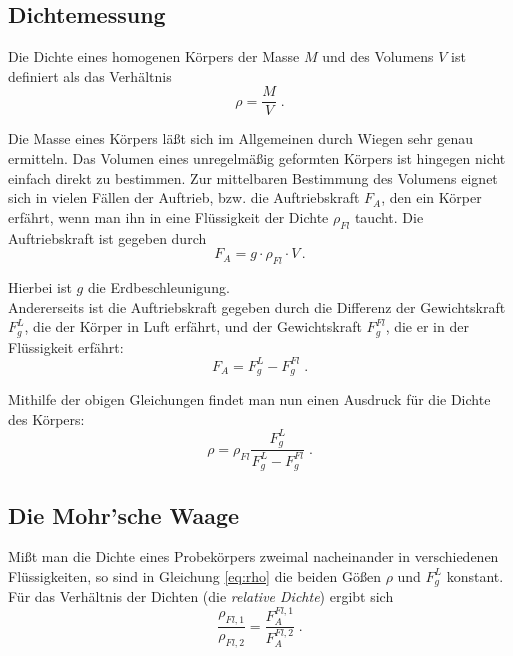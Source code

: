 \subsection{Dichtemessung}

Die Dichte eines homogenen Körpers der Masse $M$ und des Volumens $V$ ist definiert als das Verhältnis
\begin{equation} %
 \rho = \frac{M}{V} \; .
\end{equation}

Die Masse eines Körpers läßt sich im Allgemeinen durch Wiegen sehr genau ermitteln. Das Volumen eines unregelmäßig geformten Körpers ist hingegen nicht einfach direkt zu bestimmen. Zur mittelbaren Bestimmung des Volumens eignet sich in vielen Fällen der Auftrieb, bzw. die Auftriebskraft $F_A$, den ein Körper erfährt, wenn man ihn in eine Flüssigkeit der Dichte $\rho_{Fl}$ taucht. Die Auftriebskraft ist gegeben durch
\begin{equation} \label{eq:Auftrieb}
 F_A = g\cdot \rho_{Fl}\cdot V\, .
\end{equation}

Hierbei ist $g$ die Erdbeschleunigung.\\
Andererseits ist die Auftriebskraft gegeben durch die Differenz der Gewichtskraft $F_g^L$, die der Körper in Luft erfährt, und der Gewichtskraft $F_g^{Fl}$, die er in der Flüssigkeit erfährt:
\begin{equation} \label{eq:Gew-Diff}
 F_A = F_g^L - F_g^{Fl} \; .
\end{equation}

Mithilfe der obigen Gleichungen findet man nun einen Ausdruck für die Dichte des Körpers:
\begin{equation} \label{eq:rho}
 \rho = \rho_{Fl}\frac{F_g^L}{F_g^L - F_g^{Fl}} \; .
\end{equation}

\subsection{Die Mohr'sche Waage}

Mißt man die Dichte eines Probekörpers zweimal nacheinander in verschiedenen Flüssigkeiten, so sind in Gleichung \ref{eq:rho} die beiden Gößen $\rho$ und $F_g^L$ konstant. Für das Verhältnis der Dichten (die \textit{relative Dichte}) ergibt sich
\begin{equation} \label{eq:rel_Dichte}
 \frac{\rho_{Fl,1}}{\rho_{Fl,2}} = \frac{F_A^{Fl,1}}{F_A^{Fl,2}} \; .
\end{equation}

